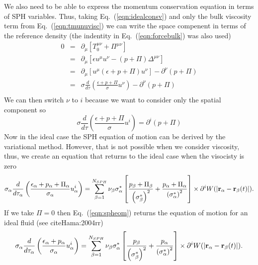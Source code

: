 \documentclass[aps,article]{revtex4}
\begin{document}
We also need to be able to express the momentum conservation equation in terms of SPH variables.  Thus, taking Eq.\ (\ref{eqn:idealconsv}) and only the bulk viscosity term from Eq.\ (\ref{eqn:tmunuvisc}) we can write the space compenent in terms of the reference density (the indentity in Eq.\ (\ref{eqn:forcebulk}) was also used)
\begin{eqnarray}
0&=&\partial_{\mu}\left[T^{\mu\nu}_{0}+\Pi^{\mu\nu}\right]\nonumber\\
&=&\partial_{\mu}\left[\epsilon u^{\mu}u^{\nu}-\left(p+\Pi\right)\Delta^{\mu\nu}\right]\nonumber\\
&=&\partial_{\mu}\left[u^{\mu}\left(\epsilon +p+\Pi\right)u^{\nu}\right]-\partial^{\nu}\left(p+\Pi\right)\nonumber\\
&=&\sigma\frac{d}{d\tau}\left(\frac{\epsilon +p+\Pi}{\sigma}u^{\nu}\right)-\partial^{\nu}\left(p+\Pi\right)\nonumber\\
\end{eqnarray}
We can then switch $\nu$ to $i$ because we want to consider only the spatial component so
\begin{equation}\label{eqn:spatcom}
\sigma\frac{d}{d\tau}\left(\frac{\epsilon +p+\Pi}{\sigma}u^{i}\right)=\partial^{i}\left(p+\Pi\right)
\end{equation}
Now in the ideal case the SPH equation of motion can be derived by the variational method.  However, that is not possible when we consider viscosity, thus, we create an equation that returns to the ideal case when the visocisty is zero
\begin{equation}\label{eqn:spheom}
\sigma_{\alpha}\frac{d}{d\tau_{\alpha}}\left(\frac{\epsilon_{\alpha} +p_{\alpha}+\Pi_{\alpha}}{\sigma_{\alpha}}u^{i}_{\alpha}\right)=\sum_{\beta=1}^{N_{SPH}}\nu_{\beta}\sigma_{\alpha}^*\left[\frac{p_{\beta}+\Pi_{\beta}}{\left(\sigma^*_{\beta}\right)^2}+\frac{p_{\alpha}+\Pi_{\alpha}}{\left(\sigma^*_{\alpha}\right)^2}\right]\times\partial^{i}W(|{\bf r}_{\alpha}-{\bf r}_{\beta}(t)|).
\end{equation}
If we take $\Pi=0$ then Eq.\ (\ref{eqn:spheom}) returns the equation of motion for an ideal fluid (see cite{Hama:2004rr})
\begin{equation}
\sigma_{\alpha}\frac{d}{d\tau_{\alpha}}\left(\frac{\epsilon_{\alpha} +p_{\alpha}}{\sigma_{\alpha}}u^{i}_{\alpha}\right)=\sum_{\beta=1}^{N_{SPH}}\nu_{\beta}\sigma_{\alpha}^*\left[\frac{p_{\beta}}{\left(\sigma^*_{\beta}\right)^2}+\frac{p_{\alpha}}{\left(\sigma^*_{\alpha}\right)^2}\right]\times\partial^{i}W(|{\bf r}_{\alpha}-{\bf r}_{\beta}(t)|).
\end{equation}
\end{document}
